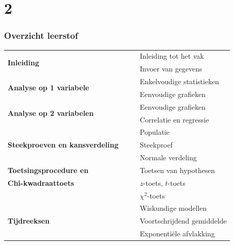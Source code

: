\documentclass{beamer}
\newcommand{\tabitem}{~~\llap{\textbullet}~~}
\begin{document}
\section{2}

\begin{frame}
  \frametitle{Overzicht leerstof}

\begin{table}[h]
\begin{tabular}{l|l}
  \multirow{2}{*}{\textbf{Inleiding}} &
     \tabitem Inleiding tot het vak \\
   & \tabitem Invoer van gegevens \\

  \hline
  \multirow{2}{*}{\textbf{Analyse op 1 variabele}} &
      \tabitem Enkelvoudige statistieken \\
    & \tabitem Eenvoudige grafieken\\

  \hline
  \multirow{2}{*}{\textbf{Analyse op 2 variabelen}} &
      \tabitem Eenvoudige grafieken \\
    & \tabitem Correlatie en regressie\\

  \hline
  \multirow{3}{*}{\textbf{Steekproeven en kansverdeling}} &
      \tabitem Populatie\\
    & \tabitem Steekproef\\
    & \tabitem Normale verdeling\\

  \hline
  \textbf{Toetsingsprocedure en} & \tabitem Toetsen van hypothesen \\
  \textbf{Chi-kwadraattoets}     & \tabitem $z$-toets, $t$-toets\\
                                 & \tabitem $\chi^{2}$-toets\\

  \hline
  \multirow{3}{*}{\textbf{Tijdreeksen}} &
      \tabitem Wiskundige modellen \\
    & \tabitem Voortschrijdend gemiddelde\\
    & \tabitem Exponentiële afvlakking\\
\end{tabular}
\end{table}
\end{frame}
\end{document}
